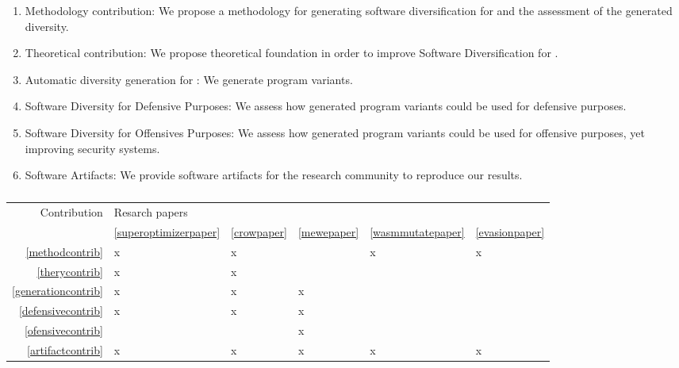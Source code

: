 \begin{enumerate}[label=\textbf{C\arabic*}:, ref=C\arabic*]
	\item \label{methodcontrib} Methodology contribution: We propose a methodology for generating software diversification for \Wasm and the assessment of the generated diversity.
	
	\item \label{therycontrib} Theoretical contribution: We propose theoretical foundation in order to improve Software Diversification for \Wasm.
	
	\item \label{generationcontrib} Automatic diversity generation for \Wasm: We generate \Wasm program variants.
	
	\item \label{defensivecontrib} Software Diversity for Defensive Purposes: We assess how generated \Wasm program variants could be used for defensive purposes.
	
	\item \label{ofensivecontrib} Software Diversity for Offensives Purposes: We assess how generated \Wasm program variants could be used for offensive purposes, yet improving security systems.
	
	\item \label{artifactcontrib} Software Artifacts: We provide software artifacts for the research community to reproduce our results.
\end{enumerate}


\begin{table}
	\begin{tabular}{r | l l l l l }
		Contribution & Resarch  papers \\
		& \ref{superoptimizerpaper} & \ref{crowpaper} & \ref{mewepaper} & \ref{wasmmutatepaper} & \ref{evasionpaper} \\
		\hline
		\ref{methodcontrib} & x & x &  & x & x \\
		\ref{therycontrib} & x & x &  &  &  \\
		\ref{generationcontrib} & x & x & x\\
		\ref{defensivecontrib} & x & x & x\\
		\ref{ofensivecontrib} & & & x\\
		\ref{artifactcontrib} & x & x & x & x & x
	\end{tabular}
	\label{contribmap}
	\caption{}
\end{table}

